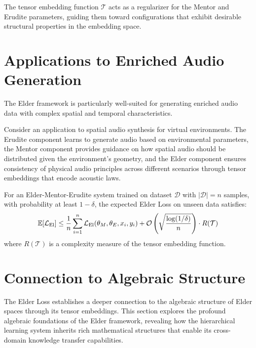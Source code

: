 \begin{corollary}
The tensor embedding function $\mathcal{T}$ acts as a regularizer for the Mentor and Erudite parameters, guiding them toward configurations that exhibit desirable structural properties in the embedding space.
\end{corollary}

\section{Applications to Enriched Audio Generation}

The Elder framework is particularly well-suited for generating enriched audio data with complex spatial and temporal characteristics.

\begin{example}
Consider an application to spatial audio synthesis for virtual environments. The Erudite component learns to generate audio based on environmental parameters, the Mentor component provides guidance on how spatial audio should be distributed given the environment's geometry, and the Elder component ensures consistency of physical audio principles across different scenarios through tensor embeddings that encode acoustic laws.
\end{example}

\begin{theorem}
For an Elder-Mentor-Erudite system trained on dataset $\mathcal{D}$ with $|\mathcal{D}| = n$ samples, with probability at least $1-\delta$, the expected Elder Loss on unseen data satisfies:
\begin{equation}
\mathbb{E}[\mathcal{L}_{\text{El}}] \leq \frac{1}{n}\sum_{i=1}^n \mathcal{L}_{\text{El}}(\theta_M, \theta_E, x_i, y_i) + \mathcal{O}\left(\sqrt{\frac{\log(1/\delta)}{n}}\right) \cdot R(\mathcal{T})
\end{equation}
where $R(\mathcal{T})$ is a complexity measure of the tensor embedding function.
\end{theorem}

\section{Connection to Algebraic Structure}

The Elder Loss establishes a deeper connection to the algebraic structure of Elder spaces through its tensor embeddings. This section explores the profound algebraic foundations of the Elder framework, revealing how the hierarchical learning system inherits rich mathematical structures that enable its cross-domain knowledge transfer capabilities.

